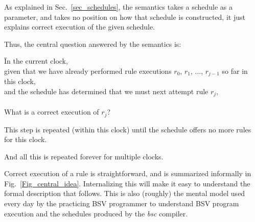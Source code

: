 \documentclass[11pt]{article}
\newcommand{\hm}{\hspace*{1em}}
\begin{document}
As explained in Sec.~\ref{sec_schedules}, the semantics takes a
schedule as a parameter, and takes no position on how that schedule is
constructed, it just explains correct execution of the given schedule.

Thus, the central question answered by the semantics is:
\begin{tabbing}
\hm \= In the current clock, \\
    \> given that we have already performed rule executions $r_0$, $r_1$, ..., $r_{j-1}$ so far in this clock, \\
    \> and the schedule has determined that we must next attempt rule $r_j$, \\
\\
    \> What is a correct execution of $r_j$?
\end{tabbing}
This step is repeated (within this clock) until the schedule offers no more rules for this clock.

And all this is repeated forever for multiple clocks.

Correct execution of a rule is straightforward, and is summarized
informally in Fig.~\ref{Fig_central_idea}.  Internalizing this will
make it easy to understand the formal description that follows.  This
is also (roughly) the mental model used every day by the practicing
BSV programmer to understand BSV program execution and the schedules
produced by the \emph{bsc} compiler.
\end{document}
